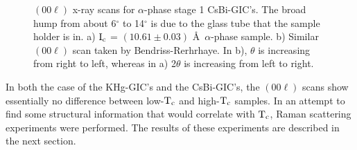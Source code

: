 \begin{figure}
\vspace{19cm}
\caption[$(00\ell)$ x-ray scans for $\alpha$-phase  stage 1 CsBi-GIC's.]{$(00\ell)$ x-ray scans for $\alpha$-phase  stage 1 CsBi-GIC's.  The broad hump
from about 6$^{\circ}$ to 14$^{\circ}$  is due to  the glass tube  that the
sample holder is in.  a) $\rm I_c$ = $(10.61 \pm 0.03)$ \AA\ $\alpha$-phase
sample.    b)      Similar        $(00\ell)$      scan     taken         by
Bendriss-Rerhrhaye.\cite{bendriss86}   In  b), $\theta$  is increasing from
right to left, whereas in a) 2$\theta$ is increasing from left to right.}
\label{csbixray}
\end{figure}

        In  both  the  case  of  the  KHg-GIC's  and  the  CsBi-GIC's,  the
$(00\ell)$  scans show essentially  no difference between low-$\rm T_c$ and
high-$\rm T_c$ samples.  In an attempt to  find some structural information
that would  correlate with  $\rm  T_c$,  Raman  scattering experiments were
performed.   The  results of these  experiments are  described  in the next
section.
